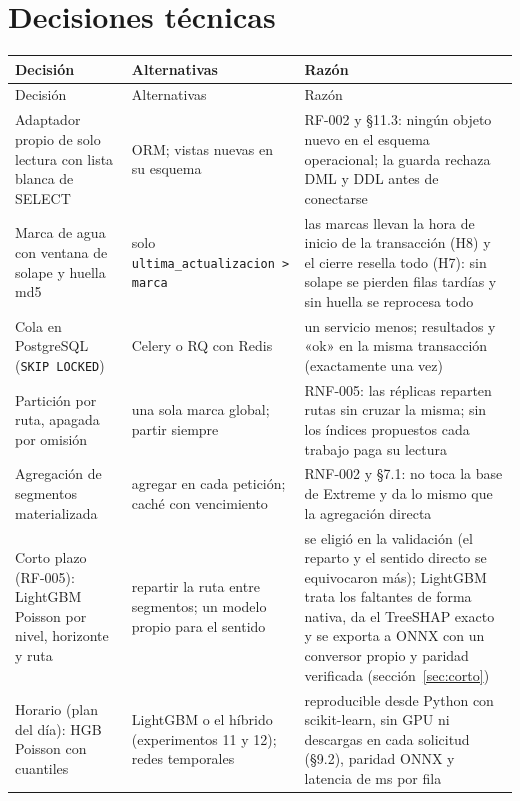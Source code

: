 \documentclass[10pt,a4paper]{article}
\begin{document}
\section{Decisiones técnicas}
\label{sec:adr}
\begin{longtable}{@{}>{\raggedright\arraybackslash}p{3.7cm}>{\raggedright\arraybackslash}p{3.8cm}>{\raggedright\arraybackslash}p{8.6cm}@{}}
\toprule Decisión & Alternativas & Razón \\ \midrule \endfirsthead
\toprule Decisión & Alternativas & Razón \\ \midrule \endhead
\bottomrule \endfoot
Adaptador propio de solo lectura con lista blanca de SELECT & ORM; vistas nuevas en su esquema & RF-002 y §11.3: ningún objeto nuevo en el esquema operacional; la guarda rechaza DML y DDL antes de conectarse \\
Marca de agua con ventana de solape y huella md5 & solo \texttt{ultima\_actualizacion > marca} & las marcas llevan la hora de inicio de la transacción (H8) y el cierre resella todo (H7): sin solape se pierden filas tardías y sin huella se reprocesa todo \\
Cola en PostgreSQL (\texttt{SKIP LOCKED}) & Celery o RQ con Redis & un servicio menos; resultados y «ok» en la misma transacción (exactamente una vez) \\
Partición por ruta, apagada por omisión & una sola marca global; partir siempre & RNF-005: las réplicas reparten rutas sin cruzar la misma; sin los índices propuestos cada trabajo paga su lectura \\
Agregación de segmentos materializada & agregar en cada petición; caché con vencimiento & RNF-002 y §7.1: no toca la base de Extreme y da lo mismo que la agregación directa \\
Corto plazo (RF-005): LightGBM Poisson por nivel, horizonte y ruta & repartir la ruta entre segmentos; un modelo propio para el sentido & se eligió en la validación (el reparto y el sentido directo se equivocaron más); LightGBM \CortoLightGBM{} trata los faltantes de forma nativa, da el TreeSHAP exacto y se exporta a ONNX con un conversor propio y paridad verificada (sección~\ref{sec:corto}) \\
Horario (plan del día): HGB Poisson con cuantiles & LightGBM o el híbrido (experimentos 11 y 12); redes temporales & reproducible desde Python con scikit-learn, sin GPU ni descargas en cada solicitud (§9.2), paridad ONNX y latencia de \OnnxMsFila{} ms por fila \\

\end{longtable}
\end{document}
